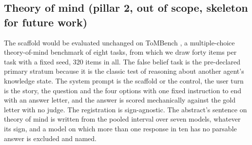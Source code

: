 \subsection{Theory of mind (pillar 2, out of scope, skeleton for future work)}
\label{sec-method-tom}


The scaffold would be evaluated unchanged on ToMBench \citep{chen2024tombench},
a multiple-choice theory-of-mind benchmark of eight tasks, from which we
draw forty items per task with a fixed seed, 320 items in all. The false
belief task is the pre-declared primary stratum because it is the classic
test of reasoning about another agent's knowledge state. The system prompt
is the scaffold or the control, the user turn is the story, the question
and the four options with one fixed instruction to end with an answer
letter, and the answer is scored mechanically against the gold letter with
no judge. The registration is sign-agnostic. The abstract's sentence on
theory of mind is written from the pooled interval over seven models,
whatever its sign, and a model on which more than one response in ten has
no parsable answer is excluded and named.


